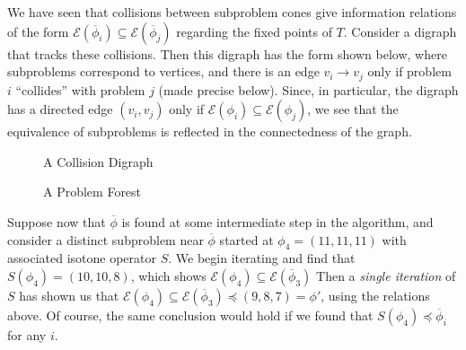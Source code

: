 \documentclass[11pt,reqno]{amsart}
\theoremstyle{definition}
\numberwithin{equation}{section}
\newcommand{\ol}{\overline}
\newcommand{\pre}{\phi}
\newcommand{\sub}{\subseteq}
\newcommand{\fix}{\mathcal{E}}
\newcommand{\peq}{\preceq}
\newcommand{\toppre}{\ol{\pre}}
\begin{document}
We have seen that collisions between subproblem cones give information relations of the form $\fix(\toppre_i) \sub \fix(\toppre_j)$ regarding the fixed points of $T$.
Consider a digraph that tracks these collisions.
Then this digraph has the form shown below, where subproblems correspond to vertices, and there is an edge $v_i \to v_j$ only if problem $i$ ``collides'' with problem $j$ (made precise below). 
Since, in particular, the digraph has a directed edge $(v_i,v_j)$ only if $\fix(\pre_i) \sub \fix(\pre_j)$, we see that the equivalence of subproblems is reflected in the connectedness of the graph. 

\begin{figure}
\caption{A Collision Digraph}
\end{figure}

\begin{figure}
\caption{A Problem Forest}
\end{figure}

Suppose now that $\toppre$ is found at some intermediate step in the algorithm, and consider a distinct subproblem near $\toppre$ started at $\pre_4 = (11,11,11)$ with associated isotone operator $S$.
We begin iterating and find that $S(\pre_4) = (10,10,8)$, which shows $\fix(\pre_4) \sub \fix(\toppre_3)$ 
Then a \emph{single iteration} of $S$ has shown us that $\fix(\pre_4) \sub \fix(\toppre_3) \peq (9,8,7) = \pre'$, using the relations above. 
Of course, the same conclusion would hold if we found that  $S(\pre_4) \peq \toppre_i$ for any $i$. 
\end{document}
